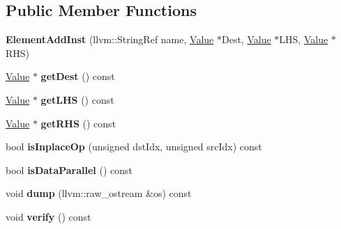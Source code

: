 \subsection*{Public Member Functions}
\begin{DoxyCompactItemize}
\item 
\mbox{\label{classglow_1_1_element_add_inst_a921d3a87553fba2e53648d6dc52c470c}} 
{\bfseries Element\+Add\+Inst} (llvm\+::\+String\+Ref name, \hyperlink{classglow_1_1_value}{Value} $\ast$Dest, \hyperlink{classglow_1_1_value}{Value} $\ast$L\+HS, \hyperlink{classglow_1_1_value}{Value} $\ast$R\+HS)
\item 
\mbox{\label{classglow_1_1_element_add_inst_a7de2b5a38f7b26ed6cbb9760bbe16cfd}} 
\hyperlink{classglow_1_1_value}{Value} $\ast$ {\bfseries get\+Dest} () const
\item 
\mbox{\label{classglow_1_1_element_add_inst_ad510b64ccd292b2c16765b04d97ad818}} 
\hyperlink{classglow_1_1_value}{Value} $\ast$ {\bfseries get\+L\+HS} () const
\item 
\mbox{\label{classglow_1_1_element_add_inst_abaaad6cccc8806f6eae48aafa804a011}} 
\hyperlink{classglow_1_1_value}{Value} $\ast$ {\bfseries get\+R\+HS} () const
\item 
\mbox{\label{classglow_1_1_element_add_inst_a8385ef0e00504fde9df9108fb32f701a}} 
bool {\bfseries is\+Inplace\+Op} (unsigned dst\+Idx, unsigned src\+Idx) const
\item 
\mbox{\label{classglow_1_1_element_add_inst_a26bda4bf8e9684b967f671c797742ea2}} 
bool {\bfseries is\+Data\+Parallel} () const
\item 
\mbox{\label{classglow_1_1_element_add_inst_ab70b6dc54f9d9c979822661163db7b0d}} 
void {\bfseries dump} (llvm\+::raw\+\_\+ostream \&os) const
\item 
\mbox{\label{classglow_1_1_element_add_inst_ac0a5c653633e8df7f4dde1de907a62e6}} 
void {\bfseries verify} () const
\end{DoxyCompactItemize}
